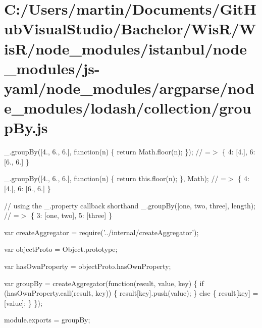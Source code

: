 \hypertarget{_c_1_2_users_2martin_2_documents_2_git_hub_visual_studio_2_bachelor_2_wis_r_2_wis_r_2node_module155eac53aebd772a5511d6f6811ca304}{}\section{C\+:/\+Users/martin/\+Documents/\+Git\+Hub\+Visual\+Studio/\+Bachelor/\+Wis\+R/\+Wis\+R/node\+\_\+modules/istanbul/node\+\_\+modules/js-\/yaml/node\+\_\+modules/argparse/node\+\_\+modules/lodash/collection/group\+By.\+js}
\+\_\+.\+group\+By(\mbox{[}4., 6., 6.\mbox{]}, function(n) \{ return Math.\+floor(n); \}); // =$>$ \{ \textquotesingle{}4\textquotesingle{}\+: \mbox{[}4.\mbox{]}, \textquotesingle{}6\textquotesingle{}\+: \mbox{[}6., 6.\mbox{]} \}

\+\_\+.\+group\+By(\mbox{[}4., 6., 6.\mbox{]}, function(n) \{ return this.\+floor(n); \}, Math); // =$>$ \{ \textquotesingle{}4\textquotesingle{}\+: \mbox{[}4.\mbox{]}, \textquotesingle{}6\textquotesingle{}\+: \mbox{[}6., 6.\mbox{]} \}

// using the {\ttfamily \+\_\+.\+property} callback shorthand \+\_\+.\+group\+By(\mbox{[}\textquotesingle{}one\textquotesingle{}, \textquotesingle{}two\textquotesingle{}, \textquotesingle{}three\textquotesingle{}\mbox{]}, \textquotesingle{}length\textquotesingle{}); // =$>$ \{ \textquotesingle{}3\textquotesingle{}\+: \mbox{[}\textquotesingle{}one\textquotesingle{}, \textquotesingle{}two\textquotesingle{}\mbox{]}, \textquotesingle{}5\textquotesingle{}\+: \mbox{[}\textquotesingle{}three\textquotesingle{}\mbox{]} \}


\begin{DoxyCodeInclude}
var createAggregator = require(\textcolor{stringliteral}{'../internal/createAggregator'});

var objectProto = Object.prototype;

var hasOwnProperty = objectProto.hasOwnProperty;

var groupBy = createAggregator(\textcolor{keyword}{function}(result, value, key) \{
  \textcolor{keywordflow}{if} (hasOwnProperty.call(result, key)) \{
    result[key].push(value);
  \} \textcolor{keywordflow}{else} \{
    result[key] = [value];
  \}
\});

module.exports = groupBy;
\end{DoxyCodeInclude}
 